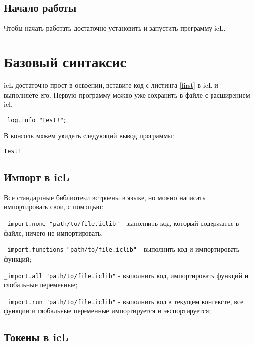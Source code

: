 \documentclass[a4paper, 14pt]{extarticle}
\begin{document}
	\subsection{Начало работы}
	
	Чтобы начать работать достаточно установить и запустить программу icL.
	
	\newpage
	\section{Базовый синтаксис}
	
	icL достаточно прост в освоении, вставите код с листинга \ref{first} в icL и выполняете его. Первую программу можно уже сохранить в файле с расширением icl.
	
	\begin{lstlisting}[caption=Первая программа,
						   label=first]
_log.info "Test!";
	\end{lstlisting}
	
	В консоль можем увидеть следующий вывод программы:
	
	\begin{lstlisting}[numbers=none]
Test!
	\end{lstlisting}
	
	\subsection{Импорт в icL}
	
	Все стандартные библиотеки встроены в языке, но можно написать импортировать свои, с помощью:
	\begin{list}{•}{}
	\item \lstinline`_import.none "path/to/file.iclib"` - выполнить код, который содержатся в файле, ничего не импортировать.
	\item \lstinline`_import.functions "path/to/file.iclib"` - выполнить код и импортировать функций;
	\item \lstinline`_import.all "path/to/file.iclib"` -  выполнить код, импортировать функций и глобальные переменные;
	\item \lstinline`_import.run "path/to/file.iclib"` - выполнить код в текущем контексте, все функции и глобальные переменные импортируется и экспортируется;
	\end{list}
	
	\subsection{Токены в icL}
	
\end{document}
